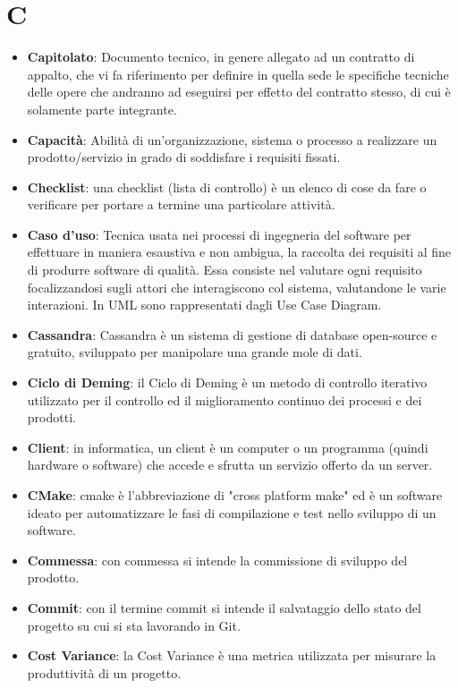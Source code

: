 \documentclass[a4paper, oneside, openany]{article}
\begin{document}
\section{C}
\begin{itemize}
\item \textbf{Capitolato}: Documento tecnico, in genere allegato ad un contratto di appalto, che vi fa riferimento per definire in quella sede le specifiche tecniche delle opere che andranno ad eseguirsi per effetto del contratto stesso, di cui è solamente parte integrante. 
\item \textbf{Capacità}: Abilità di un'organizzazione, sistema o processo a realizzare un prodotto/servizio in grado di soddisfare i requisiti fissati.
\item \textbf{Checklist}: una checklist  (lista di controllo) è un elenco di cose da fare o verificare per portare a termine una particolare attività.
\item \textbf{Caso d'uso}: Tecnica usata nei processi di ingegneria del software per effettuare in maniera esaustiva
e non ambigua, la raccolta dei requisiti al fine di produrre software di qualità. Essa consiste nel valutare ogni requisito focalizzandosi sugli attori che interagiscono col sistema,
valutandone le varie interazioni. In UML sono rappresentati dagli Use Case Diagram.
\item \textbf{Cassandra}: Cassandra è un sistema di gestione di database  open-source e gratuito, sviluppato per manipolare una grande mole di dati.
\item \textbf{Ciclo di Deming}: il Ciclo di Deming è un metodo di controllo iterativo utilizzato per il controllo ed il miglioramento continuo dei processi e dei prodotti.
\item \textbf{Client}: in informatica, un client è un computer o un programma (quindi hardware o software) che accede e sfrutta un servizio offerto da un server.
\item \textbf{CMake}: cmake è l'abbreviazione di "cross platform make" ed è un software ideato per automatizzare le fasi di compilazione e test nello sviluppo di un software.
\item \textbf{Commessa}: con commessa si intende la commissione di sviluppo del prodotto.
\item \textbf{Commit}: con il termine commit si intende il salvataggio dello stato del progetto su cui si sta lavorando in Git.
\item \textbf{Cost Variance}: la Cost Variance è una metrica utilizzata per misurare la produttività di un progetto.

\end{itemize}
\end{document}
